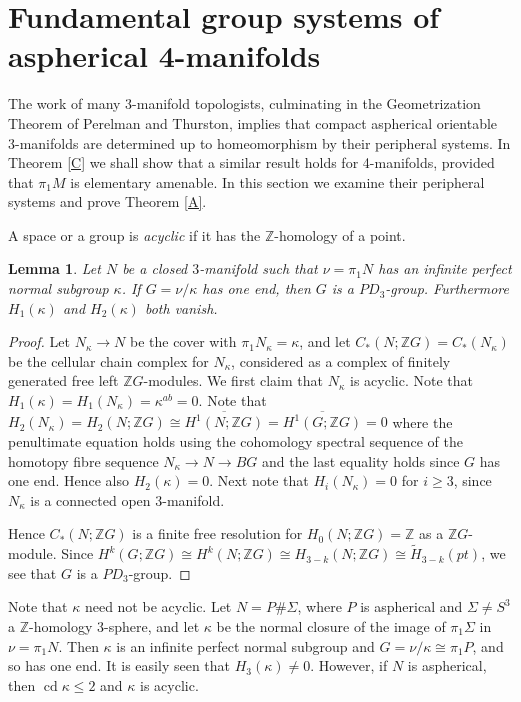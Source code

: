 \documentclass[12pt]{amsart}
\renewcommand{\geq}{\geqslant}
\renewcommand{\leq}{\leqslant}
\newtheorem{lemma}[theorem]{Lemma}
\theoremstyle{definition}
\newcommand{\Z}{\mathbb Z}
\DeclareMathOperator{\cd}{cd}
\newcommand{\ol}[1]{{\overline{#1}}}
\newcommand{\wt}[1]{{\widetilde{#1}}}
\begin{document}
\section{Fundamental group systems of aspherical 4-manifolds}

The work of many 3-manifold topologists, 
culminating in the Geometrization Theorem of Perelman and Thurston,
implies that compact aspherical orientable 3-manifolds are determined up to homeomorphism by their peripheral systems.
In Theorem \ref{C} we shall show that a similar result holds for 4-manifolds, 
provided that $\pi_1M$ is elementary amenable.   
In this section we examine their peripheral systems and prove Theorem \ref{A}.

A space or a group is {\em acyclic} if it has the $\Z$-homology of a point.

\begin{lemma}
\label{PD3 by perfect}
Let $N$ be a closed
 $3$-manifold such that $\nu=\pi_1N$ 
has an infinite perfect normal subgroup $\kappa$.
If $G=\nu/\kappa$ has one end, then $G$ is a $PD_3$-group.  Furthermore $H_1(\kappa)$ and $H_2(\kappa)$ both vanish.   
\end{lemma} 

\begin{proof} 
Let $N_\kappa \to N$ be  the cover with $\pi_1N_\kappa=\kappa$,
and let $C_*(N;\Z G) =C_*(N_\kappa)$ be the cellular chain complex for $N_\kappa$,
considered as a complex of finitely generated free left $\Z G$-modules.
We first claim that $N_\kappa$ is acyclic.
Note that $H_1(\kappa)=H_1(N_\kappa) = \kappa^{ab} = 0$.   
Note that 
$H_2(N_\kappa) = H_2(N;\Z G) \cong \ol{H^1(N; \Z G)} = 
\ol{H^1(G; \Z G)}  = 0$ 
where the penultimate equation holds using the cohomology spectral sequence of the homotopy fibre sequence  $N_\kappa \to N \to BG$ 
and the last equality holds since $G$ has one end.   
Hence also $H_2(\kappa)= 0$.
Next note that $H_i(N_\kappa) = 0$ for $i \geq 3$, since $N_\kappa$ is a connected open 3-manifold.

Hence $C_*(N;\Z G)$ is a finite free resolution for 
$H_0(N;\Z G)=\mathbb{Z}$ as a $\Z G$-module.  Since $H^k(G;\Z G) \cong H^k(N;\Z G) \cong H_{3-k}(N; \Z G) \cong \wt H_{3-k}(pt)$, we see that $G$ is a $PD_3$-group. 
\end{proof}

Note that $\kappa$ need not be acyclic.
Let $N=P\#\Sigma$, where $P$ is aspherical and $\Sigma\not=S^3$ a
$\Z$-homology 3-sphere, 
and let $\kappa$ be the normal closure of the image of $\pi_1\Sigma$ 
in $\nu=\pi_1N$.
Then $\kappa$ is an infinite perfect normal subgroup and 
$G=\nu/\kappa\cong\pi_1P$,  and so has one end.
It is easily seen that $H_3(\kappa)\not=0$.
However,  if $N$ is aspherical, then 
$\cd \kappa\leq2$ and $\kappa$ is acyclic.
\end{document}
